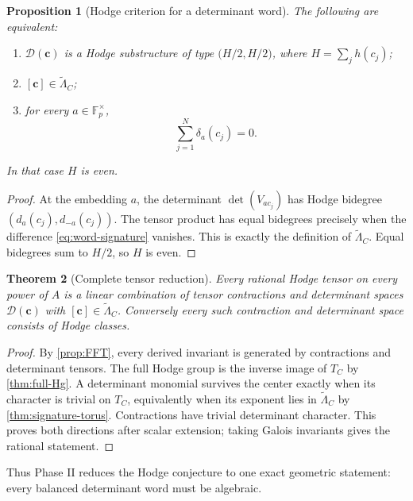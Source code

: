 \documentclass[11pt]{article}
\newtheorem{theorem}{Theorem}[section]
\newtheorem{proposition}[theorem]{Proposition}
\theoremstyle{definition}
\theoremstyle{remark}
\newcommand{\F}{\mathbb F}
\begin{document}
\begin{proposition}[Hodge criterion for a determinant word]\label{prop:Hodge-word}
The following are equivalent:
\begin{enumerate}[label=\textup{(\roman*)}]
\item $\mathcal D(\mathbf c)$ is a Hodge substructure of type
$\bigl(H/2,H/2\bigr)$, where $H=\sum_jh(c_j)$;
\item $[\mathbf c]\in\widetilde\Lambda_C$;
\item for every $a\in\F_p^\times$,
\begin{equation}\label{eq:word-signature}
 \sum_{j=1}^N\delta_a(c_j)=0.
\end{equation}
\end{enumerate}
In that case $H$ is even.
\end{proposition}

\begin{proof}
At the embedding $a$, the determinant $\det(V_{ac_j})$ has Hodge bidegree
$(d_a(c_j),d_{-a}(c_j))$.  The tensor product has equal bidegrees precisely when the difference \eqref{eq:word-signature} vanishes.  This is exactly the definition of $\widetilde\Lambda_C$.  Equal bidegrees sum to $H/2$, so $H$ is even.
\end{proof}

\begin{theorem}[Complete tensor reduction]\label{thm:tensor-reduction}
Every rational Hodge tensor on every power of $A$ is a linear combination of tensor contractions and determinant spaces $\mathcal D(\mathbf c)$ with $[\mathbf c]\in\widetilde\Lambda_C$.  Conversely every such contraction and determinant space consists of Hodge classes.
\end{theorem}

\begin{proof}
By \cref{prop:FFT}, every derived invariant is generated by contractions and determinant tensors.  The full Hodge group is the inverse image of $T_C$ by \cref{thm:full-Hg}.  A determinant monomial survives the center exactly when its character is trivial on $T_C$, equivalently when its exponent lies in $\widetilde\Lambda_C$ by \cref{thm:signature-torus}.  Contractions have trivial determinant character.  This proves both directions after scalar extension; taking Galois invariants gives the rational statement.
\end{proof}

Thus Phase II reduces the Hodge conjecture to one exact geometric statement: every balanced determinant word must be algebraic.
\end{document}
